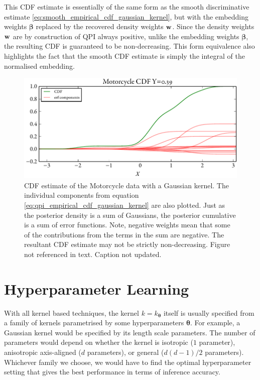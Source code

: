 \documentclass[twoside]{article} \usepackage{aistats2017}
\theoremstyle{definition}
\theoremstyle{remark}
\newcommand{\warn}[1]{{\color{RedOrange} #1}}
\newcommand{\qpi}{QPI }
\begin{document}
	This CDF estimate is essentially of the same form as the smooth discriminative estimate \eqref{eq:smooth_empirical_cdf_gaussian_kernel}, but with the embedding weights $\bm{\beta}$ replaced by the recovered density weights $\mathbf{w}$. Since the density weights $\mathbf{w}$ are by construction of \qpi always positive, unlike the embedding weights $\bm{\beta}$, the resulting CDF is guaranteed to be non-decreasing. This form equivalence also highlights the fact that the smooth CDF estimate is simply the integral of the normalised embedding.
	
		\begin{figure}
			\begin{center}
				\includegraphics[width=\columnwidth]{figures/cumulativeexampleerf}
			\end{center}
			\caption{\small CDF estimate of the Motorcycle data with a Gaussian kernel. The individual components from equation \eqref{eq:qpi_empirical_cdf_gaussian_kernel} are also plotted. Just as the posterior density is a sum of Gaussians, the posterior cumulative is a sum of error functions. Note, negative weights mean that some of the contributions from the terms in the sum are negative. The resultant CDF estimate may not be strictly non-decreasing. \warn{Figure not referenced in text. Caption not updated.}}
			\label{fig:cumulativeexampleerf} 
		\end{figure}
		
\section{Hyperparameter Learning}
\label{sec:hyperparameter_learning}

	With all kernel based techniques, the kernel $k = k_{\bm{\theta}}$ itself is usually specified from a family of kernels parametrised by some hyperparameters $\bm{\theta}$. For example, a Gaussian kernel would be specified by its length scale parameters. The number of parameters would depend on whether the kernel is isotropic ($1$ parameter), anisotropic axis-aligned ($d$ parameters), or general ($d(d - 1)/2$ parameters). Whichever family we choose, we would have to find the optimal hyperparameter setting that gives the best performance in terms of inference accuracy.
	
\end{document}
